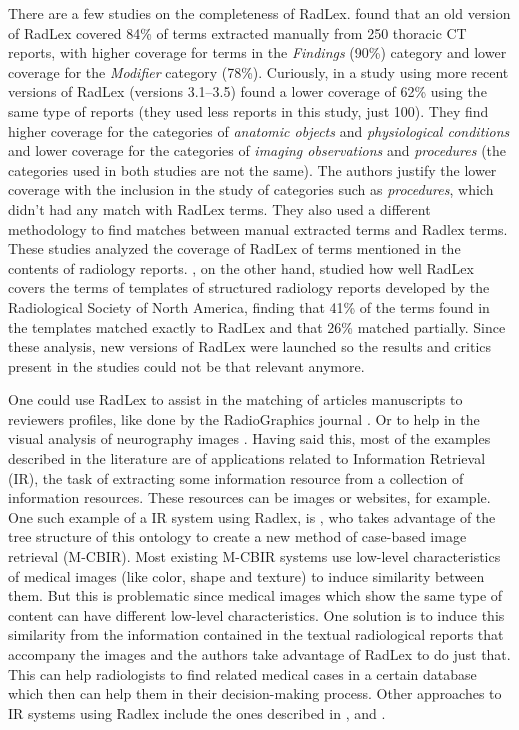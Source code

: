 There are a few studies on the completeness of RadLex. \citep{Marwede2008} found that an old version of RadLex covered 84\% of terms extracted manually from 250 thoracic CT reports, with higher coverage for terms in the \textit{Findings} (90\%) category and lower coverage for the \textit{Modifier} category (78\%). Curiously, in a study using more recent versions of RadLex (versions 3.1–3.5) \citep{Woods2013} found a lower coverage of 62\% using the same type of reports (they used less reports in this study, just 100). They find higher coverage for the categories of \textit{anatomic objects} and \textit{physiological conditions} and lower coverage for the categories of \textit{imaging observations} and \textit{procedures} (the categories used in both studies are not the same). The authors justify the lower coverage with the inclusion in the study of categories such as \textit{procedures}, which didn't had any match with RadLex terms. They also used a different methodology to find matches between manual extracted terms and Radlex terms. These studies analyzed the coverage of RadLex of terms mentioned in the contents of radiology reports. \citep{Hong2012}, on the other hand, studied how well RadLex covers the terms of templates of structured radiology reports developed by the Radiological Society of North America, finding that 41\% of the terms found in the templates matched exactly to RadLex and that 26\% matched partially. Since these analysis, new versions of RadLex were launched so the results and critics present in the studies could not be that relevant anymore.

One could use RadLex to assist in the matching of articles manuscripts to reviewers profiles, like done by the RadioGraphics journal \citep{Klein2013}. Or to help in the visual analysis of neurography images \citep{Wang2015}. Having said this, most of the examples described in the literature are of applications related to Information Retrieval (IR), the task of extracting some information resource from a collection of information resources. These resources can be images or websites, for example. One such example of a IR system using Radlex, is \citep{Spanier2016}, who takes advantage of the tree structure of this ontology to create a new method of case-based image retrieval (M-CBIR). Most existing M-CBIR systems use low-level characteristics of medical images (like color, shape and texture) to induce similarity between them. But this is problematic since medical images which show the same type of content can have different low-level characteristics. One solution is to induce this similarity from the information contained in the textual radiological reports that accompany the images and the authors take advantage of RadLex to do just that. This can help radiologists to find related medical cases in a certain database which then can help them in their decision-making process. Other approaches to IR systems using Radlex include the ones described in \citep{Do2010}, \citep{Kurtz2014} and \citep{Gerstmair2012}.



